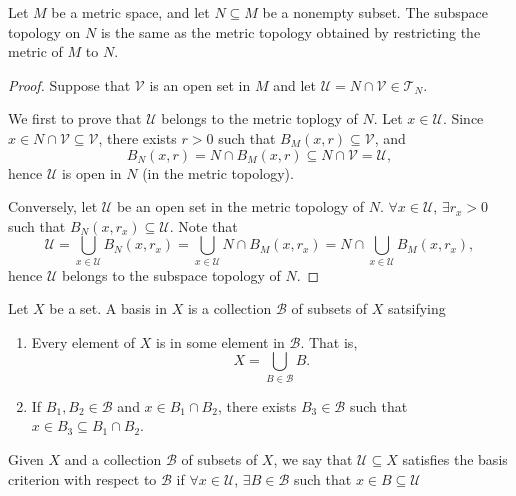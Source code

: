\begin{prop}
    Let $M$ be a metric space, and let $N\subseteq M$ be a nonempty subset. The subspace topology on $N$ is the same as the metric topology obtained by restricting the metric of $M$ to $N$.
    \begin{proof}
        Suppose that $\mathcal V$ is an open set in $M$ and let $\mathcal U = N\cap \mathcal V \in \mathcal T_N$. 
        
        We first to prove that $\mathcal U$ belongs to the metric toplogy of $N$. Let $x\in \mathcal U$. Since $x\in N\cap \mathcal V \subseteq \mathcal V$, there exists $r > 0$ such that $B_M(x, r)\subseteq \mathcal V$, and
        \[
        B_N(x, r) = N\cap B_M(x, r) \subseteq N\cap \mathcal V = \mathcal U,
        \]
        hence $\mathcal U$ is open in $N$ (in the metric topology).

        Conversely, let $\mathcal U$ be an open set in the metric topology of $N$. $\forall x\in \mathcal U$, $\exists r_x > 0$ such that $B_N(x, r_x) \subseteq \mathcal U$. Note that
        \[
        \mathcal U = \bigcup_{x\in\mathcal U} B_N(x, r_x) = \bigcup_{x\in\mathcal U} N \cap B_M(x, r_x) = N\cap \bigcup_{x\in\mathcal U} B_M(x, r_x),
        \]
        hence $\mathcal U$ belongs to the subspace topology of $N$.
    \end{proof}
\end{prop}

\begin{df}
    Let $X$ be a set. A basis in $X$ is a collection $\mathcal B$ of subsets of $X$ satsifying
    \begin{enumerate}[label={\alph*)}]
        \item Every element of $X$ is in some element in $\mathcal B$. That is,
        \[
        X = \bigcup_{B\in \mathcal B} B.
        \]
        \item If $B_1, B_2 \in \mathcal B$ and $x\in B_1 \cap B_2$, there exists $B_3 \in \mathcal B$ such that $x\in B_3 \subseteq B_1\cap B_2$.
    \end{enumerate}
\end{df}

\begin{df}
    Given $X$ and a collection $\mathcal B$ of subsets of $X$, we say that $\mathcal U\subseteq X$ satisfies the basis criterion with respect to $\mathcal B$ if $\forall x \in \mathcal U$, $\exists B \in \mathcal B$ such that $x\in B\subseteq \mathcal U$
\end{df}

